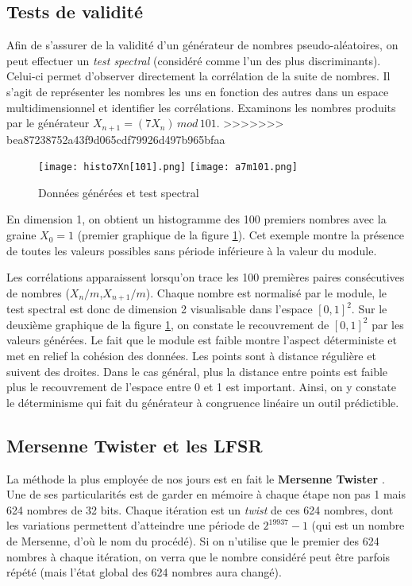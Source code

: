 \documentclass{scrartcl}
\begin{document}
\subsection{Tests de validité}
Afin de s'assurer de la validité d'un générateur de nombres pseudo-aléatoires, on peut effectuer un \textit{ test spectral} (considéré comme l'un des plus discriminants). Celui-ci permet d'observer directement la corrélation de la suite de nombres.
Il s'agit de représenter les nombres les uns en fonction des autres dans un espace multidimensionnel et identifier les corrélations.
Examinons les nombres produits par le générateur $X_{n+1} =(7 X_{n})\, mod\, 101$.
>>>>>>> bea87238752a43f9d065cdf79926d497b965bfaa
\begin{figure}
    \begin{center}
    \texttt{[image: histo7Xn[101].png]}
    \hspace{0.1\textwidth}
    \texttt{[image: a7m101.png]}
    \end{center}
    \caption{Données générées et test spectral}
  \label{fig:DGTS}
  \end{figure}
  En dimension 1, on obtient un histogramme des 100 premiers nombres avec la graine $X_0 = 1$ (premier graphique de la figure \ref{fig:DGTS}).
  Cet exemple montre la présence de toutes les valeurs possibles sans période inférieure à la valeur du module.\par
Les corrélations apparaissent lorsqu'on trace les 100 premières paires consécutives de nombres ($X_n/m$,$X_{n+1}/m$).
 Chaque nombre est normalisé par le module, le test spectral est donc de dimension 2 visualisable dans l'espace $[0,1]^2$.
 Sur le deuxième graphique de la figure \ref{fig:DGTS}, on constate le recouvrement de $[0,1]^2$ par les valeurs générées. 
 Le fait que le module est faible montre l'aspect déterministe et met en relief la cohésion des données. Les points sont à distance régulière et suivent des droites. 
 Dans le cas général, plus la distance entre points est faible plus le recouvrement de l'espace entre 0 et 1 est important.
Ainsi, on y constate le déterminisme qui fait du générateur à congruence linéaire un outil prédictible.

\subsection{Mersenne Twister et les LFSR}\label{s:MT}
La méthode la plus employée de nos jours est en fait le \textbf{Mersenne
  Twister} \cite{MT}. Une de ses particularités est de garder en mémoire à
chaque étape non pas 1 mais 624 nombres de 32 bits. Chaque itération est un
\textit{twist} de ces 624 nombres, dont les variations permettent d'atteindre
une période de $2^{19937}-1$ (qui est un nombre de Mersenne, d'où le nom du
procédé). Si on n'utilise que le premier des 624 nombres à chaque itération, on
verra que le nombre considéré peut être parfois répété (mais l'état global des
624 nombres aura changé).
\end{document}

